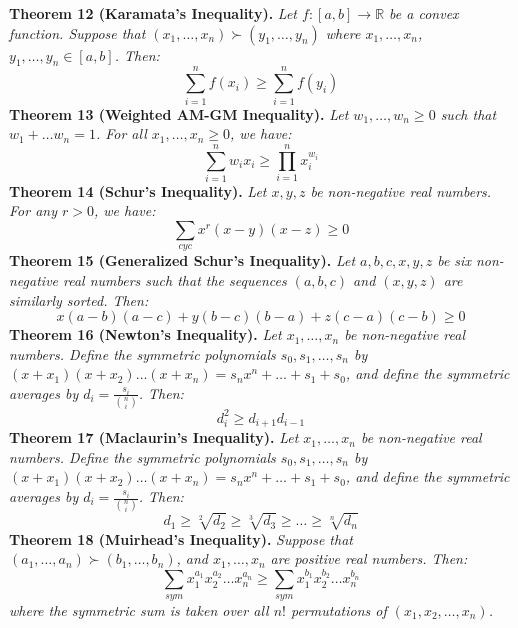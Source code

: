 \documentclass[a4paper,11pt]{article}
\begin{document}
%
%
\textbf{Theorem 12 (Karamata's Inequality).} \textit{Let $f: [a, b] \to \mathbb{R}$ be a convex function. Suppose that $(x_1, \dots, x_n) \succ (y_1, \dots, y_n)$ where $x_1, \dots, x_n$, $y_1, \dots, y_n \in [a, b]$. Then:}
\[
\sum_{i=1}^n f(x_i) \geq \sum_{i=1}^n f(y_i)
\]
%
%
\textbf{Theorem 13 (Weighted AM-GM Inequality).} \textit{Let $w_1, \dots, w_n \geq 0$ such that $w_1 + \dots w_n = 1$. For all $x_1, \dots, x_n \geq 0$, we have:}
\[
\sum_{i=1}^n w_i x_i \geq \prod_{i=1}^n x_i^{w_i}
\]
%
%
\textbf{Theorem 14 (Schur's Inequality).} \textit{Let $x, y, z$ be non-negative real numbers. For any $r > 0$, we have:}
\[
\sum_{cyc} x^r (x - y) (x - z) \geq 0
\]
%
%
\textbf{Theorem 15 (Generalized Schur's Inequality).} \textit{Let $a, b, c, x, y, z$ be six non-negative real numbers such that the sequences $(a, b, c)$ and $(x, y, z)$ are similarly sorted. Then:}
\[
x (a - b) (a - c) + y (b - c) (b - a) + z (c - a) (c - b) \geq 0
\]
%
%
\textbf{Theorem 16 (Newton's Inequality).} \textit{Let $x_1, \dots, x_n$ be non-negative real numbers. Define the symmetric polynomials $s_0, s_1, \dots, s_n$ by $(x + x_1)(x + x_2) \dots (x + x_n) = s_nx^n + \dots + s_1 + s_0$, and define the symmetric averages by $d_i = \frac{s_i}{\binom{n}{i}}$. Then:}
\[
d_i^2 \geq d_{i+1}d_{i-1}
\]
%
%
\textbf{Theorem 17 (Maclaurin's Inequality).} \textit{Let $x_1, \dots, x_n$ be non-negative real numbers. Define the symmetric polynomials $s_0, s_1, \dots, s_n$ by $(x + x_1)(x + x_2) \dots (x + x_n) = s_nx^n + \dots + s_1 + s_0$, and define the symmetric averages by $d_i = \frac{s_i}{\binom{n}{i}}$. Then:}
\[
d_1 \geq \sqrt[2]{d_2} \geq \sqrt[3]{d_3} \geq \dots \geq \sqrt[n]{d_n}
\]
%
%
\textbf{Theorem 18 (Muirhead's Inequality).} \textit{Suppose that $(a_1, \dots, a_n) \succ (b_1, \dots, b_n)$, and $x_1, \dots, x_n$ are positive real numbers. Then:}
\[
\sum_{sym} x_1^{a_1} x_2^{a_2} \dots x_n^{a_n} \geq \sum_{sym} x_1^{b_1} x_2^{b_2} \dots x_n^{b_n}
\]
\textit{where the symmetric sum is taken over all $n!$ permutations of $(x_1, x_2, \dots, x_n)$.}
\end{document}
